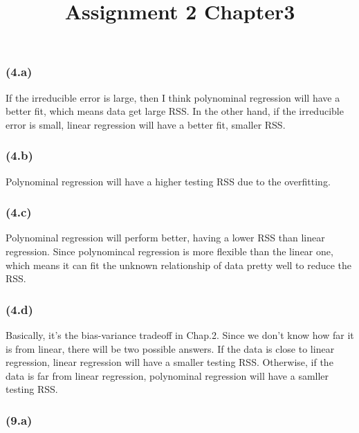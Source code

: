 \documentclass[]{article}
\title{Assignment 2 Chapter3}
\author{}
\date{}
\begin{document}
\maketitle

\hypertarget{section}{%
\subsection{}\label{section}}

\hypertarget{a}{%
\subsubsection{(4.a)}\label{a}}

If the irreducible error is large, then I think polynominal regression
will have a better fit, which means data get large RSS. In the other
hand, if the irreducible error is small, linear regression will have a
better fit, smaller RSS.

\hypertarget{b}{%
\subsubsection{(4.b)}\label{b}}

Polynominal regression will have a higher testing RSS due to the
overfitting.

\hypertarget{c}{%
\subsubsection{(4.c)}\label{c}}

Polynominal regression will perform better, having a lower RSS than
linear regression. Since polynomincal regression is more flexible than
the linear one, which means it can fit the unknown relationship of data
pretty well to reduce the RSS.

\hypertarget{d}{%
\subsubsection{(4.d)}\label{d}}

Basically, it's the bias-variance tradeoff in Chap.2. Since we don't
know how far it is from linear, there will be two possible answers. If
the data is close to linear regression, linear regression will have a
smaller testing RSS. Otherwise, if the data is far from linear
regression, polynominal regression will have a samller testing RSS.

\hypertarget{a-1}{%
\subsubsection{(9.a)}\label{a-1}}
\end{document}
